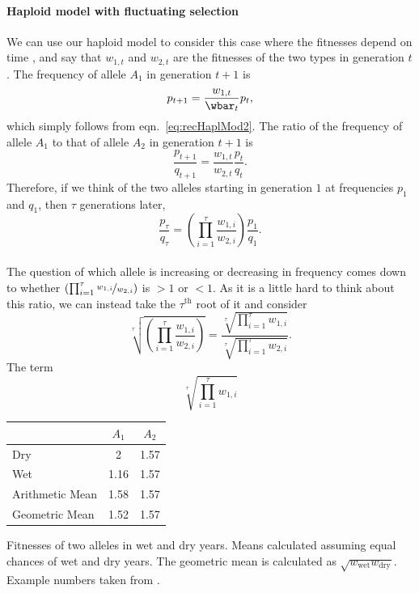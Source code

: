 \paragraph{Haploid model with fluctuating selection}

We can use our haploid model to consider this case where the fitnesses depend on time \citep{Dempster:55}, and
say that $w_{1,t}$ and $w_{2,t}$ are the fitnesses of the two types in
generation $t$. The frequency of allele $A_1$ in generation $t+1$ is
\begin{equation}
p_{t+1} = \frac{w_{1,t}}{\wbar_t} p_t,
\end{equation}
which simply follows from eqn.\ \eqref{eq:recHaplMod2}.
The ratio of the frequency of allele $A_1$ to that of allele $A_2$ in generation $t+1$ is
\begin{equation}
\frac{p_{t+1}}{q_{t+1}} = \frac{w_{1,t}}{w_{2,t}}  \frac{p_{t}}{q_{t}}.
\end{equation}
Therefore, if we think of the two alleles starting in generation $1$ at
frequencies $p_1$ and $q_1$, then $\tau$ generations later,
\begin{equation}
\frac{p_{\tau}}{q_{\tau}} = \left(\prod_{i=1}^{\tau} \frac{w_{1,i}}{w_{2,i}}  \right) \frac{p_{1}}{q_{1}}.
\end{equation}
\\

The question of which allele is increasing or decreasing in frequency comes down
to whether $\left(\prod_{i=1}^{\tau} \nicefrac{w_{1,i}}{w_{2,i}}  \right)$ is
$>1$ or $<1$. As it is a little hard to think about this ratio, we can
instead take the $\tau^{\mathrm{th}}$ root of it and consider
\begin{equation}
\sqrt[\tau]{\left(\prod_{i=1}^{\tau} \frac{w_{1,i}}{w_{2,i}}  \right)} = \frac{\sqrt[\tau]{\prod_{i=1}^{\tau}w_{1,i}}}{\sqrt[\tau]{\prod_{i=1}^{\tau}w_{2,i}}}.
\end{equation}
The term
\begin{equation}
  \sqrt[\tau]{\prod_{i=1}^{\tau}w_{1,i}}  \label{hap_geo_fitness}
\end{equation}
\begin{margintable}
  \begin{tabular}{lcc}
    & $A_1$  & $A_2$\\
    \hline
    Dry & 2 & 1.57 \\
    Wet &  1.16 & 1.57   \\
    \hline
    Arithmetic Mean & 1.58  & 1.57  \\
    Geometric Mean & 1.52 & 1.57 
  \end{tabular}
  \caption{Fitnesses of two alleles in wet and dry years. Means calculated assuming
    equal chances of wet and dry years. The geometric mean is
    calculated as
    $\sqrt{w_{\textrm{wet}}w_{\textrm{dry}}}$. Example numbers
    taken from \citet{seger1987oxford}.} \label{Table:Geom_fitness}
\end{margintable}

